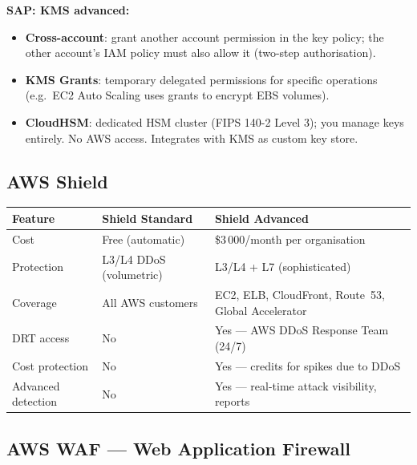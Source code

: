 \begin{sapdepth}
\textbf{SAP: KMS advanced:}
\begin{itemize}
  \item \textbf{Cross-account}: grant another account permission in the key policy;
        the other account's IAM policy must also allow it (two-step authorisation).
  \item \textbf{KMS Grants}: temporary delegated permissions for specific operations
        (e.g.\ EC2 Auto Scaling uses grants to encrypt EBS volumes).
  \item \textbf{CloudHSM}: dedicated HSM cluster (FIPS 140-2 Level 3); you manage keys entirely.
        No AWS access. Integrates with KMS as custom key store.
\end{itemize}
\end{sapdepth}



\subsection{AWS Shield}

\begin{comparebox}[title={Shield Standard vs Advanced}]
\begin{tabular}{@{}p{3.5cm}p{4cm}p{4cm}@{}}
\toprule
\textbf{Feature} & \textbf{Shield Standard} & \textbf{Shield Advanced} \\
\midrule
Cost          & Free (automatic) & \$3\,000/month per organisation \\
Protection    & L3/L4 DDoS (volumetric) & L3/L4 + L7 (sophisticated) \\
Coverage      & All AWS customers & EC2, ELB, CloudFront, Route~53, Global Accelerator \\
DRT access    & No & Yes --- AWS DDoS Response Team (24/7) \\
Cost protection & No & Yes --- credits for spikes due to DDoS \\
Advanced detection & No & Yes --- real-time attack visibility, reports \\
\bottomrule
\end{tabular}
\end{comparebox}

\subsection{AWS WAF --- Web Application Firewall}

